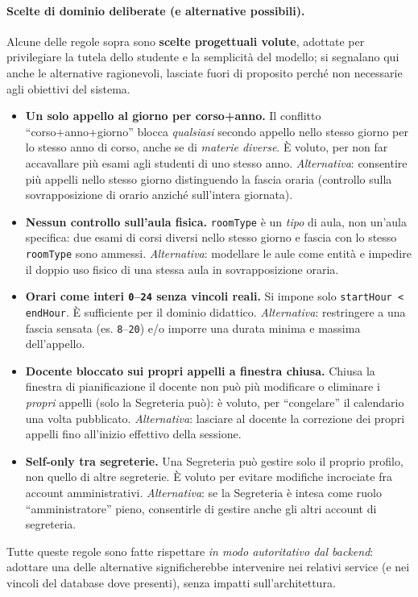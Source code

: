\documentclass[11pt,a4paper,oneside]{report}
\newcommand{\code}[1]{\texttt{\small #1}}
\begin{document}
\paragraph{Scelte di dominio deliberate (e alternative possibili).} Alcune delle
regole sopra sono \textbf{scelte progettuali volute}, adottate per privilegiare la
tutela dello studente e la semplicità del modello; si segnalano qui anche le
alternative ragionevoli, lasciate fuori di proposito perché non necessarie agli
obiettivi del sistema.
\begin{itemize}[leftmargin=1.4em]
  \item \textbf{Un solo appello al giorno per corso+anno.} Il conflitto
        ``corso+anno+giorno'' blocca \emph{qualsiasi} secondo appello nello stesso
        giorno per lo stesso anno di corso, anche se di \emph{materie diverse}.
        È voluto, per non far accavallare più esami agli studenti di uno stesso
        anno. \emph{Alternativa}: consentire più appelli nello stesso giorno
        distinguendo la fascia oraria (controllo sulla sovrapposizione di orario
        anziché sull'intera giornata).
  \item \textbf{Nessun controllo sull'aula fisica.} \code{roomType} è un
        \emph{tipo} di aula, non un'aula specifica: due esami di corsi diversi nello
        stesso giorno e fascia con lo stesso \code{roomType} sono ammessi.
        \emph{Alternativa}: modellare le aule come entità e impedire il doppio uso
        fisico di una stessa aula in sovrapposizione oraria.
  \item \textbf{Orari come interi \code{0}--\code{24} senza vincoli reali.} Si
        impone solo \code{startHour < endHour}. È sufficiente per il dominio
        didattico. \emph{Alternativa}: restringere a una fascia sensata (es.
        \code{8}--\code{20}) e/o imporre una durata minima e massima dell'appello.
  \item \textbf{Docente bloccato sui propri appelli a finestra chiusa.} Chiusa la
        finestra di pianificazione il docente non può più modificare o eliminare i
        \emph{propri} appelli (solo la Segreteria può): è voluto, per ``congelare''
        il calendario una volta pubblicato. \emph{Alternativa}: lasciare al docente
        la correzione dei propri appelli fino all'inizio effettivo della sessione.
  \item \textbf{Self-only tra segreterie.} Una Segreteria può gestire solo il
        proprio profilo, non quello di altre segreterie. È voluto per evitare
        modifiche incrociate fra account amministrativi. \emph{Alternativa}: se la
        Segreteria è intesa come ruolo ``amministratore'' pieno, consentirle di
        gestire anche gli altri account di segreteria.
\end{itemize}
Tutte queste regole sono fatte rispettare \emph{in modo autoritativo dal backend}:
adottare una delle alternative significherebbe intervenire nei relativi service
(e nei vincoli del database dove presenti), senza impatti sull'architettura.
\end{document}
